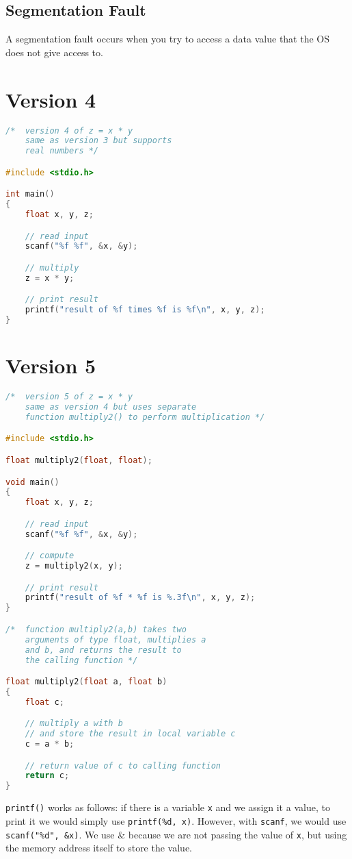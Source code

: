 \documentclass{article}
\begin{document}
\subsection*{Segmentation Fault}
A segmentation fault occurs when you try to access a data value that the OS does not give access to.

\section*{Version 4}
\begin{lstlisting}[language=C]
/* 	version 4 of z = x * y
	same as version 3 but supports
	real numbers */

#include <stdio.h>

int main()
{
    float x, y, z;

    // read input
    scanf("%f %f", &x, &y);

    // multiply
    z = x * y;

    // print result
    printf("result of %f times %f is %f\n", x, y, z);
}
\end{lstlisting}

\section*{Version 5}
\begin{lstlisting}[language=C]
/* 	version 5 of z = x * y
	same as version 4 but uses separate
	function multiply2() to perform multiplication */

#include <stdio.h>

float multiply2(float, float);

void main()
{
    float x, y, z;

    // read input
    scanf("%f %f", &x, &y);

    // compute
    z = multiply2(x, y);

    // print result
    printf("result of %f * %f is %.3f\n", x, y, z);
}

/*	function multiply2(a,b) takes two
	arguments of type float, multiplies a
	and b, and returns the result to
	the calling function */

float multiply2(float a, float b)
{
    float c;

    // multiply a with b
    // and store the result in local variable c
    c = a * b;

    // return value of c to calling function
    return c;
}
\end{lstlisting}

\texttt{printf()} works as follows: if there is a variable \texttt{x} and we assign it a value, to print it we would simply use \texttt{printf(\%d, x)}. However, with \texttt{scanf}, we would use \texttt{scanf("\%d", \&x)}. We use \& because we are not passing the value of \texttt{x}, but using the memory address itself to store the value.
\end{document}
